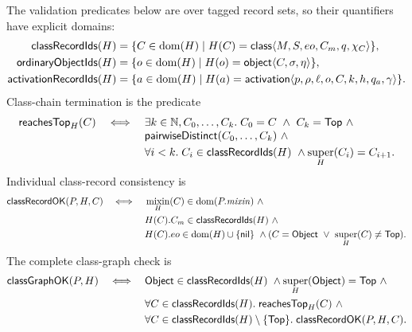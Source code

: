 The validation predicates below are over tagged record sets, so their
quantifiers have explicit domains:
\begin{equation}\label{eq:reflective-record-id-sets}
\begin{aligned}
 \mathsf{classRecordIds}(H)
  &=\{C\in\mathop{\mathrm{dom}}(H)\mid
       H(C)=\mathsf{class}\langle M,S,eo,C_m,q,\chi_C\rangle\},\\
 \mathsf{ordinaryObjectIds}(H)
  &=\{o\in\mathop{\mathrm{dom}}(H)\mid H(o)=\mathsf{object}\langle C,\sigma,\eta\rangle\},\\
 \mathsf{activationRecordIds}(H)
  &=\{a\in\mathop{\mathrm{dom}}(H)\mid
       H(a)=\mathsf{activation}\langle p,\rho,\ell,o,C,k,h,q_a,\gamma\rangle\}.
\end{aligned}
\end{equation}
Class-chain termination is the predicate
\begin{equation}\label{eq:reflective-class-chain-validity}
\begin{split}
 \mathsf{reachesTop}_{H}(C)\quad\Longleftrightarrow\quad{}
 &\exists k\in\mathbb N,C_0,\ldots,C_k.\;
 C_0=C\ \land\ C_k=\mathsf{Top}\ \land\\[-1mm]
 &\mathsf{pairwiseDistinct}(C_0,\ldots,C_k)\ \land\\
 &\forall i<k.\;C_i\in\mathsf{classRecordIds}(H)\ \land
                  \mathop{\mathrm{super}}_H(C_i)=C_{i+1}.
\end{split}
\end{equation}
Individual class-record consistency is
\begin{equation}\label{eq:reflective-class-record-validity}
\begin{split}
 \mathsf{classRecordOK}(P,H,C)\quad\Longleftrightarrow\quad{}
 &\mathop{\mathrm{mixin}}_H(C)\in\mathop{\mathrm{dom}}(P.\mathit{mixin})\ \land\\
 &H(C).C_m\in\mathsf{classRecordIds}(H)\ \land\\
 &H(C).eo\in\mathop{\mathrm{dom}}(H)\cup\{\mathsf{nil}\}\ \land
   (C=\mathsf{Object}\ \lor\ \mathop{\mathrm{super}}_H(C)\ne\mathsf{Top}).
\end{split}
\end{equation}
The complete class-graph check is
\begin{equation}\label{eq:reflective-class-graph-validity}
\begin{split}
 \mathsf{classGraphOK}(P,H)\quad\Longleftrightarrow\quad{}
 &\mathsf{Object}\in\mathsf{classRecordIds}(H)\ \land
   \mathop{\mathrm{super}}_H(\mathsf{Object})=\mathsf{Top}\ \land\\
 &\forall C\in\mathsf{classRecordIds}(H).\;
      \mathsf{reachesTop}_{H}(C)\ \land\\
 &\forall C\in\mathsf{classRecordIds}(H)\setminus\{\mathsf{Top}\}.\;
      \mathsf{classRecordOK}(P,H,C).
\end{split}
\end{equation}
